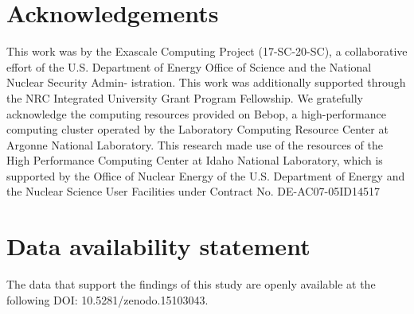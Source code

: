 \documentclass[a4paper,fleqn]{cas-sc}
\begin{document}

\printcredits

\section*{Acknowledgements}
This work was by the Exascale Computing Project (17-SC-20-SC), a collaborative
effort of the U.S. Department of Energy Office of Science and the National
Nuclear Security Admin- istration. This work was additionally supported through
the NRC Integrated University Grant Program Fellowship. %
We gratefully acknowledge the computing resources provided on Bebop, a
high-performance computing cluster operated by the Laboratory Computing Resource
Center at Argonne National Laboratory.  This research made use of the resources
of the High Performance Computing Center at Idaho National Laboratory, which is
supported by the Office of Nuclear Energy of the U.S. Department of Energy and
the Nuclear Science User Facilities under Contract No.  DE-AC07-05ID14517

\section*{Data availability statement}
The data that support the findings of this study are openly available at the
following DOI: 10.5281/zenodo.15103043.

%





\end{document}
